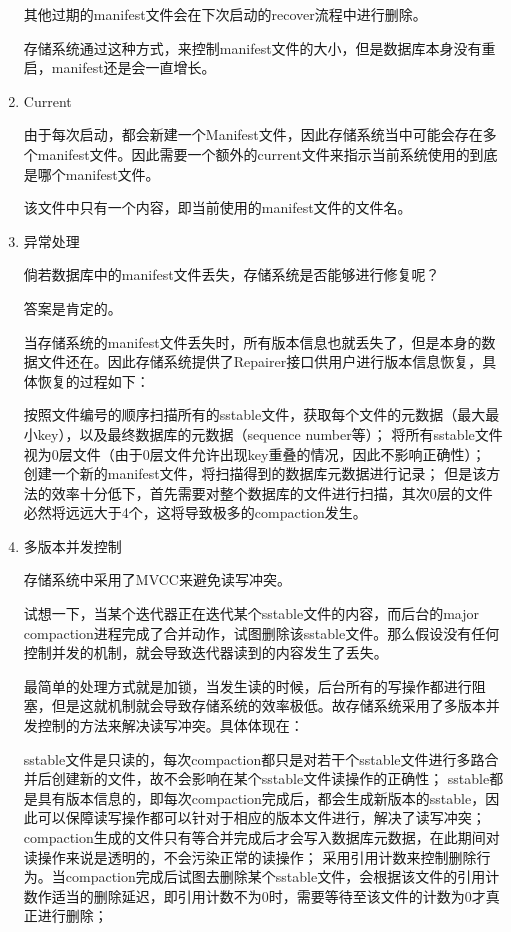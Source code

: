 \begin{enumerate}
其他过期的manifest文件会在下次启动的recover流程中进行删除。

存储系统通过这种方式，来控制manifest文件的大小，但是数据库本身没有重启，manifest还是会一直增长。


		\item Current

由于每次启动，都会新建一个Manifest文件，因此存储系统当中可能会存在多个manifest文件。因此需要一个额外的current文件来指示当前系统使用的到底是哪个manifest文件。

该文件中只有一个内容，即当前使用的manifest文件的文件名。

		\item 异常处理

倘若数据库中的manifest文件丢失，存储系统是否能够进行修复呢？



答案是肯定的。

当存储系统的manifest文件丢失时，所有版本信息也就丢失了，但是本身的数据文件还在。因此存储系统提供了Repairer接口供用户进行版本信息恢复，具体恢复的过程如下：

按照文件编号的顺序扫描所有的sstable文件，获取每个文件的元数据（最大最小key），以及最终数据库的元数据（sequence number等）；
将所有sstable文件视为0层文件（由于0层文件允许出现key重叠的情况，因此不影响正确性）；
创建一个新的manifest文件，将扫描得到的数据库元数据进行记录；
但是该方法的效率十分低下，首先需要对整个数据库的文件进行扫描，其次0层的文件必然将远远大于4个，这将导致极多的compaction发生。

		\item 多版本并发控制

存储系统中采用了MVCC来避免读写冲突。

试想一下，当某个迭代器正在迭代某个sstable文件的内容，而后台的major compaction进程完成了合并动作，试图删除该sstable文件。那么假设没有任何控制并发的机制，就会导致迭代器读到的内容发生了丢失。

最简单的处理方式就是加锁，当发生读的时候，后台所有的写操作都进行阻塞，但是这就机制就会导致存储系统的效率极低。故存储系统采用了多版本并发控制的方法来解决读写冲突。具体体现在：

sstable文件是只读的，每次compaction都只是对若干个sstable文件进行多路合并后创建新的文件，故不会影响在某个sstable文件读操作的正确性；
sstable都是具有版本信息的，即每次compaction完成后，都会生成新版本的sstable，因此可以保障读写操作都可以针对于相应的版本文件进行，解决了读写冲突；
compaction生成的文件只有等合并完成后才会写入数据库元数据，在此期间对读操作来说是透明的，不会污染正常的读操作；
采用引用计数来控制删除行为。当compaction完成后试图去删除某个sstable文件，会根据该文件的引用计数作适当的删除延迟，即引用计数不为0时，需要等待至该文件的计数为0才真正进行删除；


		
\end{enumerate}